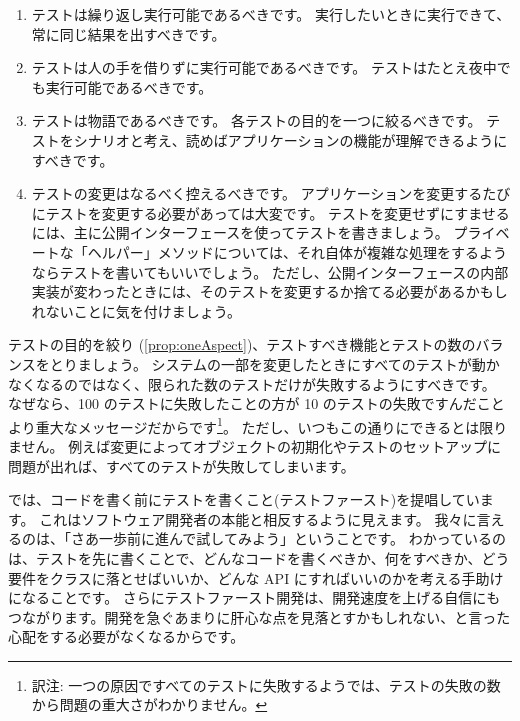 \documentclass[a4paper,10pt,twoside]{book}
\begin{document}
\begin{enumerate}
\item テストは繰り返し実行可能であるべきです。
  実行したいときに実行できて、常に同じ結果を出すべきです。

\item テストは人の手を借りずに実行可能であるべきです。
  テストはたとえ夜中でも実行可能であるべきです。

\item テストは物語であるべきです。
  各テストの目的を一つに絞るべきです。
  テストをシナリオと考え、読めばアプリケーションの機能が理解できるようにすべきです。\label{prop:oneAspect}

\item テストの変更はなるべく控えるべきです。
  アプリケーションを変更するたびにテストを変更する必要があっては大変です。
  テストを変更せずにすませるには、主に公開インターフェースを使ってテストを書きましょう。
  プライベートな「ヘルパー」メソッドについては、それ自体が複雑な処理をするようならテストを書いてもいいでしょう。
  ただし、公開インターフェースの内部実装が変わったときには、そのテストを変更するか捨てる必要があるかもしれないことに気を付けましょう。
\end{enumerate}

テストの目的を絞り (\ref{prop:oneAspect})、テストすべき機能とテストの数のバランスをとりましょう。
システムの一部を変更したときにすべてのテストが動かなくなるのではなく、限られた数のテストだけが失敗するようにすべきです。
なぜなら、100 のテストに失敗したことの方が 10 のテストの失敗ですんだことより重大なメッセージだからです\footnote{訳注: 一つの原因ですべてのテストに失敗するようでは、テストの失敗の数から問題の重大さがわかりません。}。%
ただし、いつもこの通りにできるとは限りません。
例えば変更によってオブジェクトの初期化やテストのセットアップに問題が出れば、すべてのテストが失敗してしまいます。

 では、コードを書く前にテストを書くこと(テストファースト)を提唱しています。
これはソフトウェア開発者の本能と相反するように見えます。
我々に言えるのは、「さあ一歩前に進んで試してみよう」ということです。 
わかっているのは、テストを先に書くことで、どんなコードを書くべきか、何をすべきか、どう要件をクラスに落とせばいいか、どんな API にすればいいのかを考える手助けになることです。
さらにテストファースト開発は、開発速度を上げる自信にもつながります。開発を急ぐあまりに肝心な点を見落とすかもしれない、と言った心配をする必要がなくなるからです。
\end{document}
